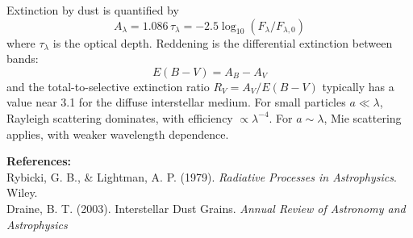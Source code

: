 \begin{technical}
Extinction by dust is quantified by
\[
A_\lambda = 1.086\, \tau_\lambda = -2.5 \log_{10} \left( {F_\lambda}/{F_{\lambda,0}} \right)
\]
where \( \tau_\lambda \) is the optical depth. Reddening is the differential extinction between bands:
\[
E(B - V) = A_B - A_V
\]
and the total-to-selective extinction ratio \( R_V = A_V / E(B - V) \) typically has a value near 3.1 for the diffuse interstellar medium. For small particles \( a \ll \lambda \), Rayleigh scattering dominates, with efficiency \( \propto \lambda^{-4} \). For \( a \sim \lambda \), Mie scattering applies, with weaker wavelength dependence.

\vspace{0.5em}
\noindent\textbf{References:}\\
Rybicki, G. B., \& Lightman, A. P. (1979). \textit{Radiative Processes in Astrophysics}. Wiley.\\
Draine, B. T. (2003). Interstellar Dust Grains. \textit{Annual Review of Astronomy and Astrophysics}
\end{technical}
